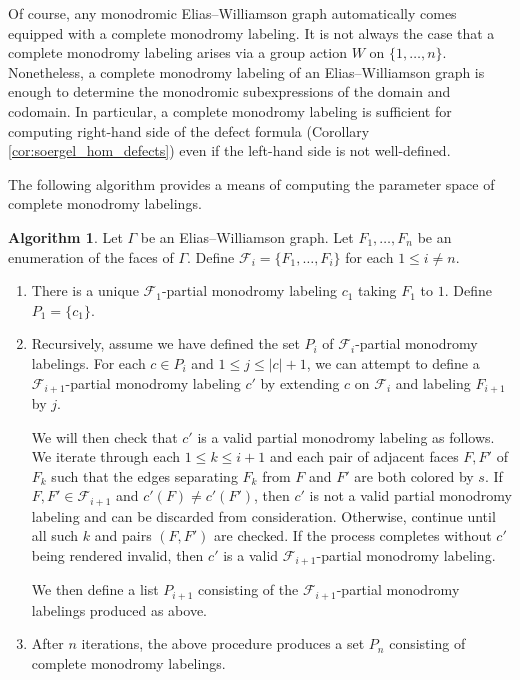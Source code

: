 \documentclass{amsart}
\newcommand{\scrF}{\mathcal{F}}
\newcommand{\abs}[1]{\lvert #1 \rvert}
\theoremstyle{definition}
\newtheorem{algorithm}[subsubsection]{Algorithm}
\numberwithin{equation}{subsection}
\begin{document}
Of course, any monodromic Elias--Williamson graph automatically comes equipped with a complete monodromy labeling.
It is not always the case that a complete monodromy labeling arises via a group action $W$ on $\{1, \ldots, n\}$. 
Nonetheless, a complete monodromy labeling of an Elias--Williamson graph is enough to determine the monodromic subexpressions of the domain and codomain.
In particular, a complete monodromy labeling is sufficient for computing right-hand side of the defect formula (Corollary \ref{cor:soergel_hom_defects}) even if the left-hand side is not well-defined.

The following algorithm provides a means of computing the parameter space of complete monodromy labelings. 

\begin{algorithm}\label{algo:monodromy_labelings}
    Let $\Gamma$ be an Elias--Williamson graph.
    Let $F_1, \ldots, F_n$ be an enumeration of the faces of $\Gamma$. Define $\scrF_i = \{F_1, \ldots, F_i\}$ for each $1 \leq i \neq n$.
    \begin{enumerate}
        \item There is a unique $\scrF_1$-partial monodromy labeling $c_1$ taking $F_1$ to $1$. Define $P_1 = \{c_1\}$.
        \item Recursively, assume we have defined the set $P_i$ of $\scrF_i$-partial monodromy labelings.
            For each $c \in P_i$ and $1 \leq j \leq \abs{c} + 1$, we can attempt to define a $\scrF_{i+1}$-partial monodromy labeling $c'$ by extending $c$ on $\scrF_i$ and labeling $F_{i+1}$ by $j$.
            
            We will then check that $c'$ is a valid partial monodromy labeling as follows. 
            We iterate through each $1 \leq k \leq i+1$ and each pair of adjacent faces $F, F'$ of $F_k$ such that the edges separating $F_k$ from $F$ and $F'$ are both colored by $s$.
            If $F, F' \in \scrF_{i+1}$ and $c' (F) \neq c' (F')$, then $c'$ is not a valid partial monodromy labeling and can be discarded from consideration. Otherwise, continue until all such $k$ and pairs $(F, F')$ are checked.
            If the process completes without $c'$ being rendered invalid, then $c'$ is a valid $\scrF_{i+1}$-partial monodromy labeling.
            
            We then define a list $P_{i+1}$ consisting of the $\scrF_{i+1}$-partial monodromy labelings produced as above.
        \item After $n$ iterations, the above procedure produces a set $P_n$ consisting of complete monodromy labelings.
    \end{enumerate}
\end{algorithm}
\end{document}
